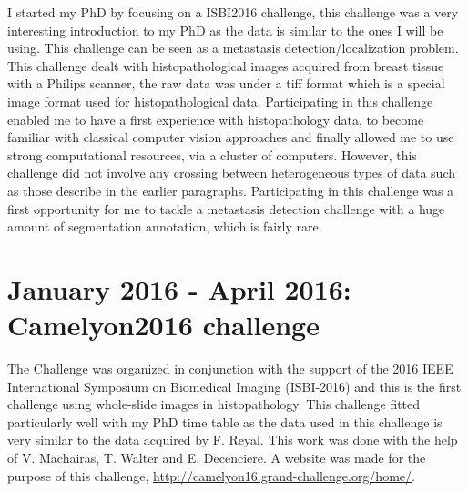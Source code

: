 \documentclass[a4paper,10pt]{article}
\begin{document}
I started my PhD by focusing on a ISBI2016 challenge, this challenge was a very interesting introduction to my PhD as the data is similar to the ones I will be using. This challenge can be seen as a metastasis detection/localization problem. This challenge dealt with histopathological images acquired from breast tissue with a Philips scanner, the raw data was under a tiff format which is a special image format used for histopathological data. Participating in this challenge enabled me to have a first experience with histopathology data, to become familiar with classical computer vision approaches and finally allowed me to use strong computational resources, via a cluster of computers. However, this challenge did not involve any crossing between heterogeneous types of data such as those describe in the earlier paragraphs. Participating in this challenge was a first opportunity for me to tackle a metastasis detection challenge with a huge amount of segmentation annotation, which is fairly rare.

\section{January 2016 - April 2016: Camelyon2016 challenge}

The Challenge was organized in conjunction with the support of the 2016 IEEE International Symposium on Biomedical Imaging  (ISBI-2016) and this is the first challenge using whole-slide images in histopathology. This challenge fitted particularly well with my PhD time table as the data used in this challenge is very similar to the data acquired by F. Reyal. 
This work was done with the help of V. Machairas, T. Walter and E. Decenciere. A website was made for the purpose of this challenge, \url{http://camelyon16.grand-challenge.org/home/}.
\end{document}
